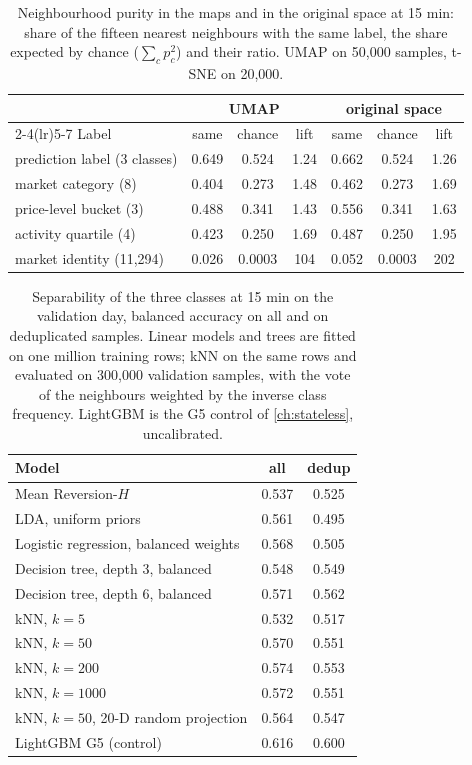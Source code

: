\begin{table}[p]
\centering
\caption{Neighbourhood purity in the maps and in the original space at 15 min: share of
the fifteen nearest neighbours with the same label, the share expected by chance
($\sum_c p_c^2$) and their ratio.  UMAP on 50{,}000 samples, t-SNE on 20{,}000.}
\label{tab:structure:purity}
\small
\begin{tabular}{lccc ccc}
\toprule
& \multicolumn{3}{c}{UMAP} & \multicolumn{3}{c}{original space} \\
\cmidrule(lr){2-4}\cmidrule(lr){5-7}
Label & same & chance & lift & same & chance & lift \\
\midrule
prediction label (3 classes) & 0.649 & 0.524 & 1.24 & 0.662 & 0.524 & 1.26 \\
market category (8)          & 0.404 & 0.273 & 1.48 & 0.462 & 0.273 & 1.69 \\
price-level bucket (3)       & 0.488 & 0.341 & 1.43 & 0.556 & 0.341 & 1.63 \\
activity quartile (4)        & 0.423 & 0.250 & 1.69 & 0.487 & 0.250 & 1.95 \\
market identity (11{,}294)   & 0.026 & 0.0003 & 104 & 0.052 & 0.0003 & 202 \\
\bottomrule
\end{tabular}
\end{table}

\begin{table}[p]
\centering
\caption{Separability of the three classes at 15 min on the validation day, balanced
accuracy on all and on deduplicated samples.  Linear models and trees are fitted on one
million training rows; kNN on the same rows and evaluated on 300{,}000 validation samples,
with the vote of the neighbours weighted by the inverse class frequency.  LightGBM is the
G5 control of \cref{ch:stateless}, uncalibrated.}
\label{tab:structure:sep15}
\small
\begin{tabular}{lcc}
\toprule
Model & all & dedup \\
\midrule
Mean Reversion-$H$                      & 0.537 & 0.525 \\
LDA, uniform priors                     & 0.561 & 0.495 \\
Logistic regression, balanced weights   & 0.568 & 0.505 \\
Decision tree, depth 3, balanced        & 0.548 & 0.549 \\
Decision tree, depth 6, balanced        & 0.571 & 0.562 \\
kNN, $k = 5$                            & 0.532 & 0.517 \\
kNN, $k = 50$                           & 0.570 & 0.551 \\
kNN, $k = 200$                          & 0.574 & 0.553 \\
kNN, $k = 1000$                         & 0.572 & 0.551 \\
kNN, $k = 50$, 20-D random projection   & 0.564 & 0.547 \\
LightGBM G5 (control)                   & 0.616 & 0.600 \\
\bottomrule
\end{tabular}
\end{table}

